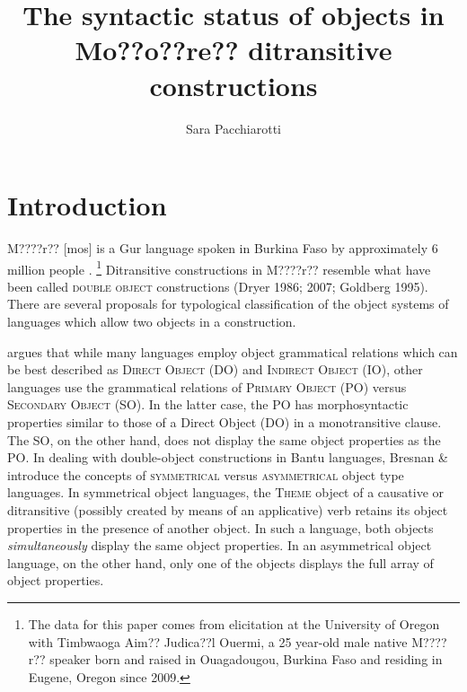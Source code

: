 \documentclass[output=paper]{langsci/langscibook}
\title{The syntactic status of objects in {Mo??o??re??} ditransitive constructions}
\author{%
 Sara Pacchiarotti\affiliation{University of Oregon}
}
\begin{document}


\section{Introduction}

M????r?? [mos] is a Gur language spoken in Burkina Faso by approximately 6 million people \citep{LewisEtAl2016}.{ }\footnote{ The data for this paper comes from elicitation at the University of Oregon with Timbwaoga Aim?? Judica??l Ouermi, a 25 year-old male native M????r?? speaker born and raised in Ouagadougou, Burkina Faso and residing in Eugene, Oregon since 2009.}\textsuperscript{ } Ditransitive constructions in M????r?? resemble what have been called \textsc{double object} constructions (Dryer 1986; 2007; Goldberg 1995). There are several proposals for typological classification of the object systems of languages which allow two objects in a construction.

\citet{Dryer1986} argues that while many languages employ object grammatical relations which can be best described as \textsc{Direct Object} (DO) and \textsc{Indirect Object }(IO), other languages use the grammatical relations of \textsc{Primary Object} (PO) versus \textsc{Secondary Object} (SO). In the latter case, the PO has morphosyntactic properties similar to those of a Direct Object (DO) in a monotransitive clause. The SO, on the other hand, does not display the same object properties as the PO. In dealing with double-object constructions in Bantu languages, Bresnan \& \citet{Moshi1990} introduce the concepts of \textsc{symmetrical} versus \textsc{asymmetrical} object type languages. In symmetrical object languages, the \textsc{Theme} object of a causative or ditransitive (possibly created by means of an applicative) verb retains its object properties in the presence of another object. In such a language, both objects \textit{simultaneously }display the same object properties. In an asymmetrical object language, on the other hand, only one of the objects displays the full array of object properties. 
\end{document}
